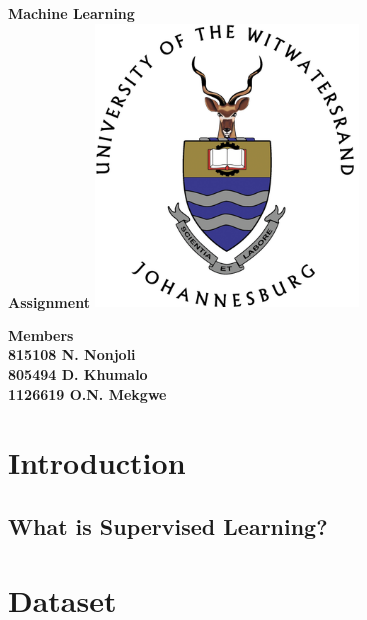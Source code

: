 \documentclass[12pt]{article}
\begin{document}
	
	\begin{titlepage}
		
		\centering
		
		{\bfseries\LARGE
			Machine Learning\\
			Assignment
		}
		\vfill
		\includegraphics[width=7cm]{img/logo.png}
		\vfill
		\begin{center}
			{\bfseries\LARGE Members}\\
			{\bfseries\large
				815108 N. Nonjoli\\
				805494 D. Khumalo\\
				1126619 O.N. Mekgwe\\
			}
		\end{center}
		\vfill
		\thispagestyle{empty}
	\end{titlepage}

	\tableofcontents
	\thispagestyle{empty}
	\newpage
	
	
	\section{Introduction}
	\setcounter{page}{1}
	\subsection{What is Supervised Learning?}
	\newpage
	
	
	\section{Dataset}
\end{document}
